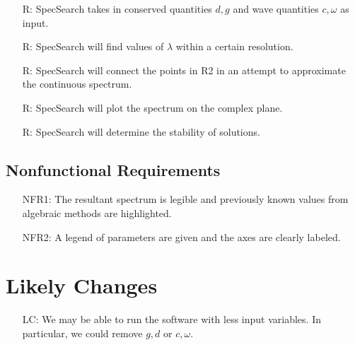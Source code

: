 \documentclass[12pt]{article}
\newcounter{reqnum} %
\newcounter{lcnum} %
\begin{document}
\noindent \begin{itemize}

\item[R\refstepcounter{reqnum}\thereqnum \label{R_Inputs}:] SpecSearch takes in 
conserved quantities $d,g$ and wave quantities $c,\omega$ as input. 

\item[R\refstepcounter{reqnum}\thereqnum \label{R_OutputInputs}:] SpecSearch 
will find values of $\lambda$ within a certain resolution.

\item[R\refstepcounter{reqnum}\thereqnum \label{R_Calculate}:] SpecSearch will 
connect the points in R2 in an attempt to approximate the continuous spectrum.

\item[R\refstepcounter{reqnum}\thereqnum \label{R_VerifyOutput}:] SpecSearch 
will plot the spectrum on the complex plane. 

\item[R\refstepcounter{reqnum}\thereqnum \label{R_VerifyOutput}:] SpecSearch 
will determine the stability of solutions.  


\end{itemize}

\subsection{Nonfunctional Requirements}
\noindent \begin{itemize}
\item[NFR1:] The resultant spectrum is legible and previously known values from 
algebraic methods are highlighted. 
\item[NFR2:] A legend of parameters are given and the axes are clearly labeled.
\end{itemize}


\section{Likely Changes}    

\noindent \begin{itemize}

\item[LC\refstepcounter{lcnum}\thelcnum\label{LC_meaningfulLabel}:] We may be 
able to run the software with less input variables. In particular, we could 
remove $g,d$ or $c, \omega$. 

\end{itemize}
\end{document}
